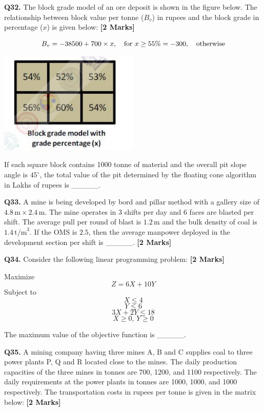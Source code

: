 \documentclass[11pt]{article}
\newcommand{\questionb}[2]{
    \noindent\textbf{Q#2.} #1 \hfill \textbf{[2 Marks]}
}
\begin{document}
\questionb{The block grade model of an ore deposit is shown in the figure below. The relationship between block value per tonne (\(B_v\)) in rupees and the block grade in percentage (\(x\)) is given below:}{32}

\[
B_v = -38500 + 700 \times x, \quad \text{for } x \geq 55\% \\
= -300, \quad \text{otherwise}
\]

\begin{center}
\includegraphics[width=0.5\textwidth]{figures/32.png}
\end{center}

If each square block contains 1000 tonne of material and the overall pit slope angle is \(45^\circ\), the total value of the pit determined by the floating cone algorithm in Lakhs of rupees is \_\_\_\_\_.
\vspace{0.5cm}

\questionb{A mine is being developed by bord and pillar method with a gallery size of \(4.8 \, \text{m} \times 2.4 \, \text{m}\). The mine operates in 3 shifts per day and 6 faces are blasted per shift. The average pull per round of blast is \(1.2 \, \text{m}\) and the bulk density of coal is \(1.4 \, \text{t/m}^3\). If the OMS is \(2.5\), then the average manpower deployed in the development section per shift is \_\_\_\_\_.}{33}
\vspace{0.5cm}

\questionb{Consider the following linear programming problem:}{34}

Maximize  
\[ Z = 6X + 10Y \]  
Subject to  
\[ X \leq 4 \]  
\[ Y \leq 6 \]  
\[ 3X + 2Y \leq 18 \]  
\[ X \geq 0, \, Y \geq 0 \]

The maximum value of the objective function is \_\_\_\_\_.
\vspace{0.5cm}

\questionb{A mining company having three mines A, B and C supplies coal to three power plants P, Q and R located close to the mines. The daily production capacities of the three mines in tonnes are 700, 1200, and 1100 respectively. The daily requirements at the power plants in tonnes are 1000, 1000, and 1000 respectively. The transportation costs in rupees per tonne is given in the matrix below:}{35}
\end{document}
